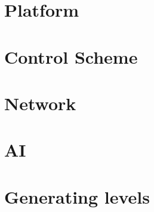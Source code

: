 \chapter{Platform}


\chapter{Control Scheme}


\chapter{Network}


\chapter{AI}


\chapter{Generating levels}

